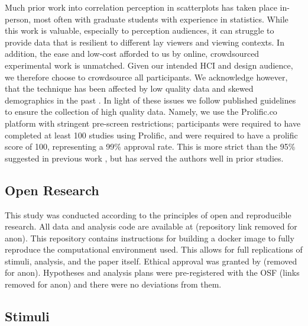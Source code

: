 \documentclass[manuscript, review, anonymous, screen]{acmart}
\begin{document}
Much prior work into correlation perception in scatterplots has taken
place in-person, most often with graduate students with experience in
statistics. While this work is valuable, especially to perception
audiences, it can struggle to provide data that is resilient to
different lay viewers and viewing contexts. In addition, the ease and
low-cost afforded to us by online, crowdsourced experimental work is
unmatched. Given our intended HCI and design audience, we therefore
choose to crowdsource all participants. We acknowledge however, that the
technique has been affected by low quality data and skewed demographics
in the past \citep{chmielewski_2020, charalambides_2021, peer_2021}. In
light of these issues we follow published guidelines \citep{peer_2021}
to ensure the collection of high quality data. Namely, we use the
Prolific.co platform \citep{prolific} with stringent pre-screen
restrictions; participants were required to have completed at least 100
studies using Prolific, and were required to have a prolific score of
100, representing a 99\% approval rate. This is more strict than the
95\% suggested in previous work \citep{peer_2021}, but has served the
authors well in prior studies.

\hypertarget{sec-open-research}{%
\subsection{Open Research}\label{sec-open-research}}

This study was conducted according to the principles of open and
reproducible research. All data and analysis code are available at
(repository link removed for anon). This repository contains
instructions for building a docker image to fully reproduce the
computational environment used. This allows for full replications of
stimuli, analysis, and the paper itself. Ethical approval was granted by
(removed for anon). Hypotheses and analysis plans were pre-registered
with the OSF (links removed for anon) and there were no deviations from
them.

\hypertarget{sec-scatter-gen}{%
\subsection{Stimuli}\label{sec-scatter-gen}}
\end{document}
